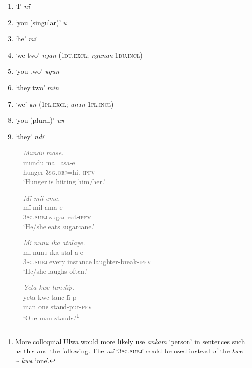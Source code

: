 \begin{enumerate}[noitemsep, label={\arabic*}, align=left, widest=190, labelsep=1ex,leftmargin=*]
\item  ‘I’ \textit{nï}

\item  ‘you (singular)’ \textit{u}

\item  ‘he’ \textit{mï}

\item  ‘we two’ \textit{ngan} (\textsc{1du.excl}; \textit{ngunan} \textsc{1du.incl})

\item  ‘you two’ \textit{ngun}

\item  ‘they two’ \textit{min}

\item  ‘we’ \textit{an} (\textsc{1pl.excl}; \textit{unan} \textsc{1pl.incl})

\item  ‘you (plural)’ \textit{un}

\item  ‘they’ \textit{ndï}
\end{enumerate}

\begin{quote}\textit{Mundu mase.}\\
\gll    mundu  ma=asa-e\\
hunger  3\textsc{sg.obj}=hit-\textsc{ipfv}\\
\glt    ‘Hunger is hitting him/her.’\end{quote}

\newpage

\begin{quote}\textit{Mï mil ame.}\\
\gll    mï      mil    ama-e\\
    \textsc{3sg.subj}  sugar  eat-\textsc{ipfv}\\
\glt    ‘He/she eats sugarcane.’\end{quote}

\begin{quote}\textit{Mï nunu ika atalaye.}\\
\gll    mï      nunu  ika      atal-a-e\\
    \textsc{3sg.subj}  every  instance  laughter-break-\textsc{ipfv}\\
\glt    ‘He/she laughs often.’\end{quote}

\begin{quote}\textit{Yeta kwe tanelïp.}\\
\gll    yeta  kwe  tane-lï-p\\
    man  one    stand-put-\textsc{pfv}\\
\glt    ‘One man stands.’\footnote{More colloquial Ulwa would more likely use \textit{ankam} ‘person’ in sentences such as this and the following. The   \textit{mï} ‘3\textsc{sg.subj}’ could be used instead of the  \textit{kwe} {\textasciitilde} \textit{kwa} ‘one’.}\end{quote}


